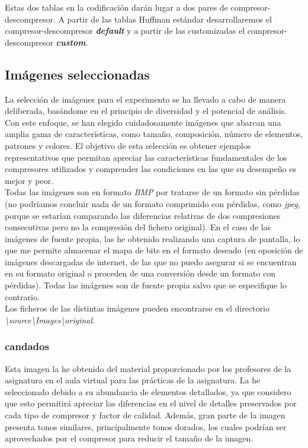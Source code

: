 \documentclass[12pt,a4paper]{article}
\begin{document}
Estas dos tablas en la codificación darán lugar a dos pares de compresor-descompresor. A partir de las tablas Huffman estándar desarrollaremos el compresor-descompresor \textbf{\textit{default}} y a partir de las customizadas el compresor-descompresor \textbf{\textit{custom}}.\\

\subsection{Imágenes seleccionadas}
La selección de imágenes para el experimento se ha llevado a cabo de manera deliberada, basándome en el principio de diversidad y el potencial de análisis. Con este enfoque, se han elegido cuidadosamente imágenes que abarcan una amplia gama de características, como tamaño, composición, número de elementos, patrones y colores. El objetivo de esta selección es obtener ejemplos representativos que permitan apreciar las características fundamentales de los compresores utilizados y comprender las condiciones en las que su desempeño es mejor y peor.\\

Todas las imágenes son en formato \textit{BMP} por tratarse de un formato sin pérdidas (no podríamos concluir nada de un formato comprimido con pérdidas, como \textit{jpeg}, porque se estarían comparando las diferencias relativas de dos compresiones consecutivas pero no la compresión del fichero original). En el caso de las imágenes de fuente propia, las he obtenido realizando una captura de pantalla, lo que me permite almacenar el mapa de bits en el formato deseado (en oposición de imágenes descargadas de internet, de las que no puedo asegurar si se encuentran en su formato original o proceden de una conversión desde un formato con pérdidas). Todas las imágenes son de fuente propia salvo que se especifique lo contrario.\\

Los ficheros de las distintas imágenes pueden encontrarse en el directorio \textit{\textbackslash source\textbackslash Images\textbackslash original}.

\subsubsection{candados}
Esta imagen la he obtenido del material proporcionado por los profesores de la asignatura en el aula virtual para las prácticas de la asignatura. La he seleccionado debido a su abundancia de elementos detallados, ya que considero que esto permitirá apreciar las diferencias en el nivel de detalles preservados por cada tipo de compresor y factor de calidad. Además, gran parte de la imagen presenta tonos similares, principalmente tonos dorados, los cuales podrían ser aprovechados por el compresor para reducir el tamaño de la imagen.\\
\end{document}

